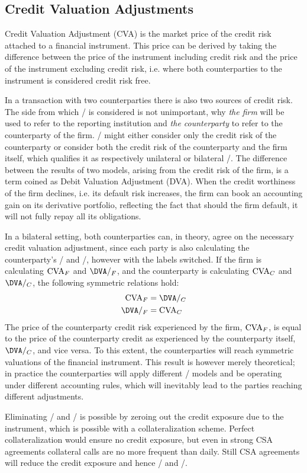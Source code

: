 \documentclass[../../../main.tex]{subfiles}
\begin{document}
    \subsection{Credit Valuation Adjustments}
        Credit Valuation Adjustment (CVA) is the market price of the credit risk attached to a financial instrument.
        This price can be derived by taking the difference between the price of the instrument including credit risk
        and the price of the instrument excluding credit risk, 
        i.e. where both counterparties to the instrument is considered credit risk free.

        In a transaction with two counterparties there is also two sources of credit risk.
        The side from which \CVA/ is considered is not unimportant, 
        why \textit{the firm} will be used to refer to the reporting institution 
        and \textit{the counterparty} to refer to the counterparty of the firm.
        \CVA/ might either consider only the credit risk of the counterparty 
        or consider both the credit risk of the counterparty and the firm itself,
        which qualifies it as respectively unilateral or bilateral \CVA/.
        The difference between the results of two models, arising from the credit risk of the firm,
        is a term coined as Debit Valuation Adjustment (DVA).
        When the credit worthiness of the firm declines, i.e. its default risk increases,
        the firm can book an accounting gain on its derivative portfolio,
        reflecting the fact that should the firm default, it will not fully repay all its obligations.

        In a bilateral setting, both counterparties can, in theory, agree on the necessary credit valuation adjustment,
        since each party is also calculating the counterparty's \CVA/ and \DVA/, however with the labels switched.
        If the firm is calculating $\CVA/_{F}$ and $\DVA/_{F}$, 
        and the counterparty is calculating $\CVA/_{C}$ and $\DVA/_{C}$,
        the following symmetric relations hold:
            \begin{align*}
                \CVA/_{F} &= \DVA/_{C} \\
                \DVA/_{F} &= \CVA/_{C}
            \end{align*}
        The price of the counterparty credit risk experienced by the firm, $\CVA/_{F}$,
        is equal to the price of the counterparty credit as experienced by the counterparty itself, $\DVA/_{C}$,
        and vice versa.
        To this extent, the counterparties will reach symmetric valuations of the financial instrument. 
        This result is however merely theoretical; 
        in practice the counterparties will apply different \CVA/ models
        and be operating under different accounting rules, 
        which will inevitably lead to the parties reaching different adjustments. 
        
        Eliminating \CVA/ and \DVA/ is possible by zeroing out the credit exposure due to the instrument,
        which is possible with a collateralization scheme. 
        Perfect collateralization would ensure no credit exposure,
        but even in strong CSA agreements collateral calls are no more frequent than daily.
        Still CSA agreements will reduce the credit exposure and hence \CVA/ and \DVA/.
\end{document}
